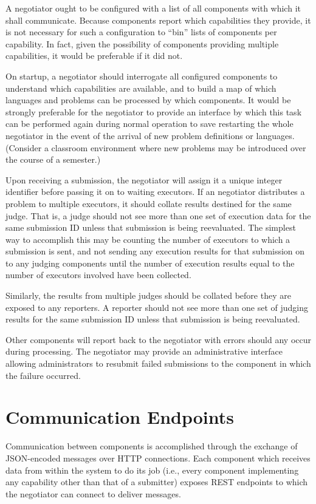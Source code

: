 \documentclass[11pt,letterpaper]{article}
\begin{document}
A negotiator ought to be configured with a list of all components with which it
shall communicate. Because components report which capabilities they provide,
it is not necessary for such a configuration to ``bin'' lists of components per
capability. In fact, given the possibility of components providing multiple
capabilities, it would be preferable if it did not.

On startup, a negotiator should interrogate all configured components to
understand which capabilities are available, and to build a map of which
languages and problems can be processed by which components. It would be
strongly preferable for the negotiator to provide an interface by which this
task can be performed again during normal operation to save restarting the
whole negotiator in the event of the arrival of new problem definitions or
languages. (Consider a classroom environment where new problems may be
introduced over the course of a semester.)

Upon receiving a submission, the negotiator will assign it a unique integer
identifier before passing it on to waiting executors. If an negotiator
distributes a problem to multiple executors, it should collate results destined
for the same judge. That is, a judge should not see more than one set of
execution data for the same submission ID unless that submission is being
reevaluated. The simplest way to accomplish this may be counting the number of
executors to which a submission is sent, and not sending any execution results
for that submission on to any judging components until the number of execution
results equal to the number of executors involved have been collected.

Similarly, the results from multiple judges should be collated before they are
exposed to any reporters. A reporter should not see more than one set of
judging results for the same submission ID unless that submission is being
reevaluated.

Other components will report back to the negotiator with errors should any
occur during processing. The negotiator may provide an administrative interface
allowing administrators to resubmit failed submissions to the component in
which the failure occurred.

\section{Communication Endpoints}
\label{endpoints}

Communication between components is accomplished through the exchange of
JSON-encoded messages over HTTP connections. Each component which receives data
from within the system to do its job (i.e., every component implementing any
capability other than that of a submitter) exposes REST endpoints to which the
negotiator can connect to deliver messages.
\end{document}
